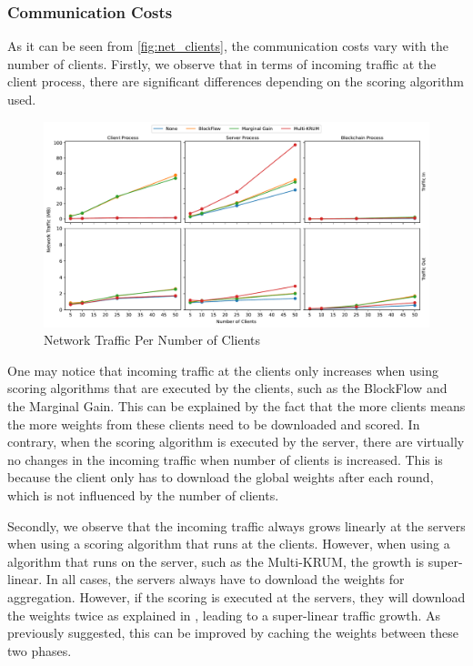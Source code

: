 \subsubsection{Communication Costs}

As it can be seen from \autoref{fig:net_clients}, the communication costs vary with the number of clients. Firstly, we observe that in terms of incoming traffic at the client process, there are significant differences depending on the scoring algorithm used.

\begin{figure}[!hb]
    \centering
    \includegraphics[width=\textwidth]{graphics/clients/traffic.pdf}
    \caption{Network Traffic Per Number of Clients}
    \label{fig:net_clients}
\end{figure}

One may notice that incoming traffic at the clients only increases when using scoring algorithms that are executed by the clients, such as the BlockFlow and the Marginal Gain. This can be explained by the fact that the more clients means the more weights from these clients need to be downloaded and scored. In contrary, when the scoring algorithm is executed by the server, there are virtually no changes in the incoming traffic when number of clients is increased. This is because the client only has to download the global weights after each round, which is not influenced by the number of clients.

Secondly, we observe that the incoming traffic always grows linearly at the servers when using a scoring algorithm that runs at the clients. However, when using a algorithm that runs on the server, such as the Multi-KRUM, the growth is super-linear. In all cases, the servers always have to download the weights for aggregation. However, if the scoring is executed at the servers, they will download the weights twice as explained in , leading to a super-linear traffic growth. As previously suggested, this can be improved by caching the weights between these two phases.

